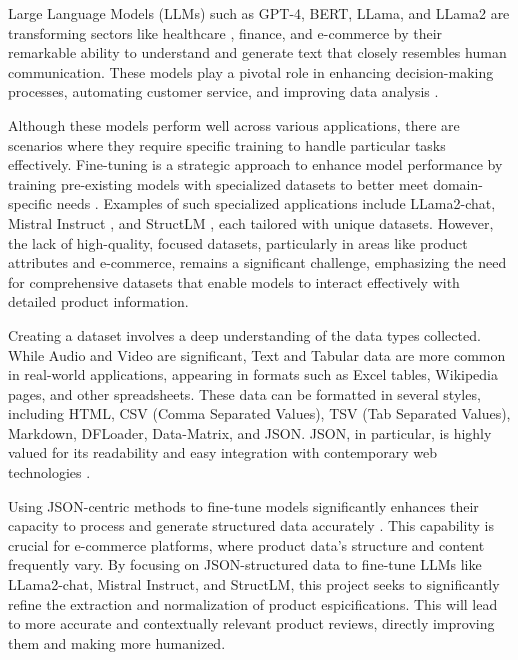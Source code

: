 Large Language Models (LLMs) such as GPT-4, BERT, LLama, and LLama2 are transforming sectors like healthcare \cite{he2023survey} \cite{REDDY2023101304}, finance, and e-commerce by their remarkable ability to understand and generate text that closely resembles human communication. These models play a pivotal role in enhancing decision-making processes, automating customer service, and improving data analysis \cite{Varshney_2024}.

Although these models perform well across various applications, there are scenarios where they require specific training to handle particular tasks effectively. Fine-tuning is a strategic approach to enhance model performance by training pre-existing models with specialized datasets to better meet domain-specific needs \cite{Bergmann_2024}. Examples of such specialized applications include LLama2-chat\cite{touvron2023llama}, Mistral Instruct \cite{jiang2023mistral}, and StructLM \cite{zhuang2024structlm}, each tailored with unique datasets. However, the lack of high-quality, focused datasets, particularly in areas like product attributes and e-commerce, remains a significant challenge, emphasizing the need for comprehensive datasets that enable models to interact effectively with detailed product information.

Creating a dataset involves a deep understanding of the data types collected. While Audio and Video are significant, Text and Tabular data are more common in real-world applications, appearing in formats such as Excel tables, Wikipedia pages, and other spreadsheets. These data can be formatted in several styles, including HTML, CSV (Comma Separated Values), TSV (Tab Separated Values), Markdown, DFLoader, Data-Matrix, and JSON. JSON, in particular, is highly valued for its readability and easy integration with contemporary web technologies \cite{singha2023tabular}.

Using JSON-centric methods to fine-tune models significantly enhances their capacity to process and generate structured data accurately \cite{gao2024jsontuning}. This capability is crucial for e-commerce platforms, where product data's structure and content frequently vary. By focusing on JSON-structured data to fine-tune LLMs like LLama2-chat, Mistral Instruct, and StructLM, this project seeks to significantly refine the extraction and normalization of product espicifications. This will lead to more accurate and contextually relevant product reviews, directly improving them and making more humanized.